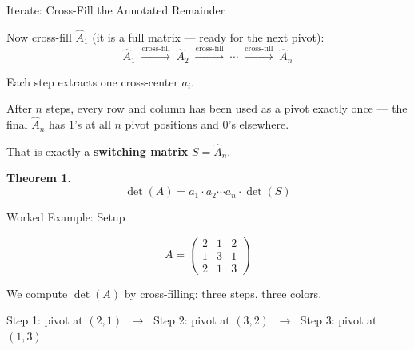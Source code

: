 \documentclass[10pt]{beamer}
\theoremstyle{definition}
\newtheorem{thm}{Theorem}[section]
\newcommand{\x}[1]{\alert{\textbf{#1}}}
\newcommand{\rd}[1]{{\color{red!70!black}#1}}
\newcommand{\bl}[1]{{\color{blue!70!black}#1}}
\newcommand{\gn}[1]{{\color{green!60!black}#1}}
\begin{document}
\begin{frame}{Iterate: Cross-Fill the Annotated Remainder}

Now cross-fill $\widehat{A}_1$ (it is a full matrix --- ready for the next pivot):
$$
\widehat{A}_1 \;\xrightarrow{\text{cross-fill}}\; \widehat{A}_2 \;\xrightarrow{\text{cross-fill}}\; \cdots \;\xrightarrow{\text{cross-fill}}\; \widehat{A}_n
$$

\vfill

Each step extracts one cross-center $a_i$.

After $n$ steps, every row and column has been used as a pivot exactly once --- the final $\widehat{A}_n$ has $1$'s at all $n$ pivot positions and $0$'s elsewhere.

\vfill

That is exactly a \x{switching matrix} $S = \widehat{A}_n$.

\vfill

\begin{thm}
$$
\boxed{\det(A) = a_1 \cdot a_2 \cdots a_n \cdot \det(S)}
$$
\end{thm}

\end{frame}


\begin{frame}{Worked Example: Setup}

$$
A = \begin{pmatrix} 2 & 1 & 2 \\ 1 & 3 & 1 \\ 2 & 1 & 3 \end{pmatrix}
$$

\vfill

We compute $\det(A)$ by cross-filling: three steps, three colors.

\vfill

\begin{center}
\rd{Step 1: pivot at $(2,1)$} $\;\to\;$
\bl{Step 2: pivot at $(3,2)$} $\;\to\;$
\gn{Step 3: pivot at $(1,3)$}
\end{center}

\end{frame}
\end{document}
